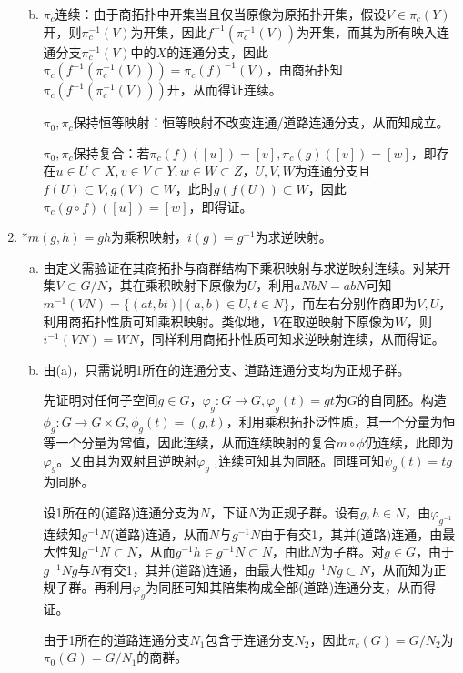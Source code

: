 \documentclass[a4paper,UTF8,fontset=windows]{ctexart}
\begin{document}
\begin{enumerate}[(1)]
\begin{enumerate}[(a)]
\begin{enumerate}[(i)]
    \end{enumerate}
    \item
    $\pi_c$连续：由于商拓扑中开集当且仅当原像为原拓扑开集，假设$V\in\pi_c(Y)$开，则$\pi_c^{-1}(V)$为开集，因此$f^{-1}(\pi_c^{-1}(V))$为开集，而其为所有映入连通分支$\pi_c^{-1}(V)$中的$X$的连通分支，因此$\pi_c(f^{-1}(\pi_c^{-1}(V)))=\pi_c(f)^{-1}(V)$，由商拓扑知$\pi_c(f^{-1}(\pi_c^{-1}(V)))$开，从而得证连续。
    
    $\pi_0,\pi_c$保持恒等映射：恒等映射不改变连通/道路连通分支，从而知成立。
    
    $\pi_0,\pi_c$保持复合：若$\pi_c(f)([u])=[v],\pi_c(g)([v])=[w]$，即存在$u\in U\subset X,v\in V\subset Y,w\in W\subset Z$，$U,V,W$为连通分支且$f(U)\subset V,g(V)\subset W$，此时$g(f(U))\subset W$，因此$\pi_c(g\circ f)([u])=[w]$，即得证。
    \end{enumerate}
    
    \item
    *$m(g,h)=gh$为乘积映射，$i(g)=g^{-1}$为求逆映射。
    \begin{enumerate}[(a)]
    \item
    由定义需验证在其商拓扑与商群结构下乘积映射与求逆映射连续。对某开集$V\subset G/N$，其在乘积映射下原像为$U$，利用$aNbN=abN$可知$m^{-1}(VN)=\{(at,bt)|(a,b)\in U,t\in N\}$，而左右分别作商即为$V,U$，利用商拓扑性质可知乘积映射。类似地，$V$在取逆映射下原像为$W$，则$i^{-1}(VN)=WN$，同样利用商拓扑性质可知求逆映射连续，从而得证。
    
    \item
    由(a)，只需说明1所在的连通分支、道路连通分支均为正规子群。
    
    先证明对任何子空间$g\in G$，$\varphi_g:G\to G,\varphi_g(t)=gt$为$G$的自同胚。构造$\phi_g:G\to G\times G,\phi_g(t)=(g,t)$，利用乘积拓扑泛性质，其一个分量为恒等一个分量为常值，因此连续，从而连续映射的复合$m\circ \phi$仍连续，此即为$\varphi_g$。又由其为双射且逆映射$\varphi_{g^{-1}}$连续可知其为同胚。同理可知$\psi_g(t)=tg$为同胚。
    
    设1所在的(道路)连通分支为$N$，下证$N$为正规子群。设有$g,h\in N$，由$\varphi_{g^{-1}}$连续知$g^{-1}N$(道路)连通，从而$N$与$g^{-1}N$由于有交1，其并(道路)连通，由最大性知$g^{-1}N\subset N$，从而$g^{-1}h\in g^{-1}N\subset N$，由此$N$为子群。对$g\in G$，由于$g^{-1}Ng$与$N$有交1，其并(道路)连通，由最大性知$g^{-1}Ng\subset N$，从而知为正规子群。再利用$\varphi_g$为同胚可知其陪集构成全部(道路)连通分支，从而得证。
    
    由于1所在的道路连通分支$N_1$包含于连通分支$N_2$，因此$\pi_c(G)=G/N_2$为$\pi_0(G)=G/N_1$的商群。
    

\end{enumerate}
\end{enumerate}
\end{document}
